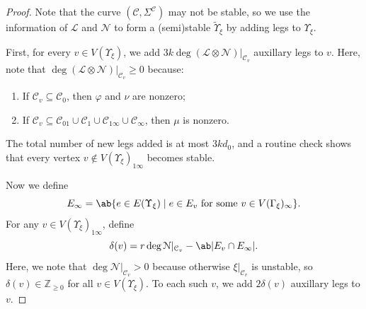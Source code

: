 \documentclass{amsart}
\theoremstyle{definition}
\theoremstyle{remark}
\theoremstyle{plain}
\theoremstyle{definition}
\theoremstyle{remark}
\newcommand{\Z}{\mathbb{Z}}
\newcommand{\mc}[1]{\mathcal{#1}}
\newcommand{\wt}[1]{\widetilde{#1}}
\newcommand{\1}{\mathbf{1}}
\newcommand{\2}{\mathbf{2}}
\newcommand{\3}{\mathbf{3}}
\begin{document}
\begin{proof}
    Note that the curve $(\mc{C}, \Sigma^{\mc{C}})$ may not be stable, so we use the information of $\mc{L}$ and $\mc{N}$ to form a (semi)stable $\wt{\Upsilon}_{\xi}$ by adding legs to $\Upsilon_{\xi}$.

    First, for every $v \in V(\Upsilon_{\xi})$, we add $3k \deg (\mc{L} \otimes \mc{N})|_{\mc{C}_v}$ auxillary legs to $v$. Here, note that $\deg (\mc{L} \otimes \mc{N})|_{\mc{C}_v} \geq 0$ because:
    \begin{enumerate}
        \item If $\mc{C}_v \subseteq \mc{C}_0$, then $\varphi$ and $\nu$ are nonzero;
        \item If $\mc{C}_v \subseteq \mc{C}_{01} \cup \mc{C}_1 \cup \mc{C}_{1\infty} \cup \mc{C}_{\infty}$, then $\mu$ is nonzero.
    \end{enumerate}
    The total number of new legs added is at most $3kd_0$, and a routine check shows that every vertex $v \notin V(\Upsilon_{\xi})_{1\infty}$ becomes stable.

    Now we define
    \[ E_{\infty} = \ab\{e \in E(\Upsilon_{\xi}) \mid e \in E_v \text{ for some } v \in V(\Gamma_{\xi})_{\infty}\}. \]
    For any $v \in V(\Upsilon_{\xi})_{1\infty}$, define
    \[ \delta(v) = r \deg \mc{N}|_{\mc{C}_v} - \ab\vert E_v \cap E_{\infty}\vert . \]
    Here, we note that $\deg \mc{N}|_{\mc{C}_v} > 0$ because otherwise $\xi|_{\mc{C}_v}$ is unstable, so $\delta(v) \in \Z_{\geq 0}$ for all $v \in V(\Upsilon_{\xi})$. To each such $v$, we add $2 \delta(v)$ auxillary legs to $v$.


\end{proof}
\end{document}
